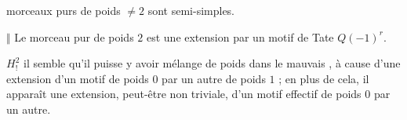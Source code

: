 \margin{\unsure{!}}



morceaux purs de poids $\ne 2$ sont semi-simples.

$\Vert$ Le morceau pur de poids $2$ est une extension par un motif de Tate $Q(-1)^{r}$.

$H^2_!$ \quad il semble qu'il puisse y avoir mélange de poids dans le mauvais , à cause d'une extension d'un motif  de poids $0$ par un autre de poids $1$ ; en plus de cela, il apparaît une extension, peut-être non triviale, d'un motif effectif de poids $0$  par un autre.
